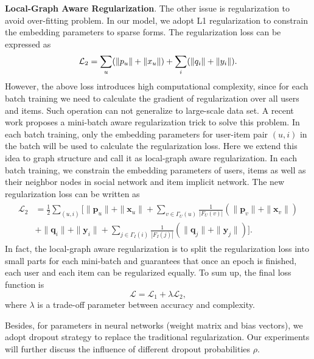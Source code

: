 \documentclass[sigconf]{acmart}
\begin{document}
\textbf{Local-Graph Aware Regularization}. The other issue is regularization to avoid over-fitting problem. In our model, we adopt L1 regularization to constrain the embedding parameters to sparse forms. The regularization loss can be expressed as
\begin{equation}\nonumber
\mathcal L_2 = \sum\limits_u (\|\boldmath p_u\| + \|\boldmath x_u\|) + \sum\limits_i(\|\boldmath q_i\| + \|\boldmath y_i\|).
\end{equation}
However, the above loss introduces high computational complexity, since for each batch training we need to calculate the gradient of regularization over all users and items. Such operation can not generalize to large-scale data set. A recent work \cite{deepinterest} proposes a mini-batch aware regularization trick to solve this problem. In each batch training, only the embedding parameters for user-item pair $(u,i)$ in the batch will be used to calculate the regularization loss. Here we extend this idea to graph structure and call it as local-graph aware regularization. In each batch training, we constrain the embedding parameters of users, items as well as their neighbor nodes in social network and item implicit network. The new regularization loss can be written as
\begin{eqnarray}\nonumber
\begin{aligned}
\mathcal L_2 &=\frac{1}{2}\sum\limits_{(u,i)} \big[\|\mathbf p_u\| + \|\mathbf x_u\|+
\sum\limits_{v\in \Gamma_U(u)} \frac{1}{|F_U(v)|}(\|\mathbf p_v\| + \|\mathbf x_v\|) \\
&+\|\mathbf q_i\| + \|\mathbf y_i\| + \sum\limits_{j\in \Gamma_I(i)} \frac{1}{|F_I(j)|}(\|\mathbf q_j\| + \|\mathbf y_j\|)\big].
\end{aligned}
\end{eqnarray}
In fact, the local-graph aware regularization is to split the regularization loss into small parts for each mini-batch and guarantees that once an epoch is finished, each user and each item can be regularized equally.
To sum up, the final loss function is
\begin{equation}\label{eq-loss}
\mathcal L = \mathcal L_1 + \lambda \mathcal L_2,
\end{equation}
where $\lambda$ is a trade-off parameter between accuracy and complexity. 

Besides, for parameters in neural networks (weight matrix and bias vectors), we adopt dropout strategy to replace the traditional regularization. Our experiments will further discuss the influence of different dropout probabilities $\rho$.
\end{document}

